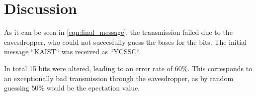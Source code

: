 \section{Discussion}
\label{sec:discussion}
As it can be seen in \autoref{eqn:final_message}, the transmission failed due to the eavesdropper,
who could not succesfully guess the bases for the bits. The initial message ``KAIST`` was received
as ``YCSSC``. 

In total 15 bits were altered, leading to an error rate of $60\%$. This corresponds to
an exceptionally bad transmission through the eavesdropper, as by random guessing $50\%$ would be
the epectation value.
